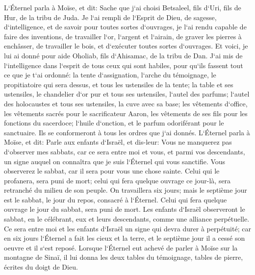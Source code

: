 \verse L`Éternel parla à Moïse, et dit: 
\verse Sache que j`ai choisi Betsaleel, fils d`Uri, fils de Hur, de la tribu de Juda. 
\verse Je l`ai rempli de l`Esprit de Dieu, de sagesse, d`intelligence, et de savoir pour toutes sortes d`ouvrages, 
\verse je l`ai rendu capable de faire des inventions, de travailler l`or, l`argent et l`airain, 
\verse de graver les pierres à enchâsser, de travailler le bois, et d`exécuter toutes sortes d`ouvrages. 
\verse Et voici, je lui ai donné pour aide Oholiab, fils d`Ahisamac, de la tribu de Dan. J`ai mis de l`intelligence dans l`esprit de tous ceux qui sont habiles, pour qu`ils fassent tout ce que je t`ai ordonné: 
\verse la tente d`assignation, l`arche du témoignage, le propitiatoire qui sera dessus, et tous les ustensiles de la tente; 
\verse la table et ses ustensiles, le chandelier d`or pur et tous ses ustensiles, 
\verse l`autel des parfums; l`autel des holocaustes et tous ses ustensiles, la cuve avec sa base; 
\verse les vêtements d`office, les vêtements sacrés pour le sacrificateur Aaron, les vêtements de ses fils pour les fonctions du sacerdoce; 
\verse l`huile d`onction, et le parfum odoriférant pour le sanctuaire. Ils se conformeront à tous les ordres que j`ai donnés. 
\verse L`Éternel parla à Moïse, et dit: 
\verse Parle aux enfants d`Israël, et dis-leur: Vous ne manquerez pas d`observer mes sabbats, car ce sera entre moi et vous, et parmi vos descendants, un signe auquel on connaîtra que je suis l`Éternel qui vous sanctifie. 
\verse Vous observerez le sabbat, car il sera pour vous une chose sainte. Celui qui le profanera, sera puni de mort; celui qui fera quelque ouvrage ce jour-là, sera retranché du milieu de son peuple. 
\verse On travaillera six jours; mais le septième jour est le sabbat, le jour du repos, consacré à l`Éternel. Celui qui fera quelque ouvrage le jour du sabbat, sera puni de mort. 
\verse Les enfants d`Israël observeront le sabbat, en le célébrant, eux et leurs descendants, comme une alliance perpétuelle. 
\verse Ce sera entre moi et les enfants d`Israël un signe qui devra durer à perpétuité; car en six jours l`Éternel a fait les cieux et la terre, et le septième jour il a cessé son oeuvre et il s`est reposé. 
\verse Lorsque l`Éternel eut achevé de parler à Moïse sur la montagne de Sinaï, il lui donna les deux tables du témoignage, tables de pierre, écrites du doigt de Dieu. 

\chapter{}

